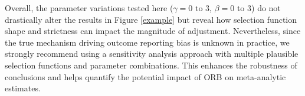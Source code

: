 \documentclass[twocolumn]{article}\usepackage[]{graphicx}\usepackage[]{xcolor}
\begin{document}


Overall, the parameter variations tested here ($\gamma=0$ to $3$, $\beta=0$ to $3$) do not drastically alter the results in Figure \ref{example} but reveal how selection function shape and strictness can impact the magnitude of adjustment. Nevertheless, since the true mechanism driving outcome reporting bias is unknown in practice, we strongly recommend using a sensitivity analysis approach with multiple plausible selection functions and parameter combinations. This enhances the robustness of conclusions and helps quantify the potential impact of ORB on meta-analytic estimates.
\end{document}
